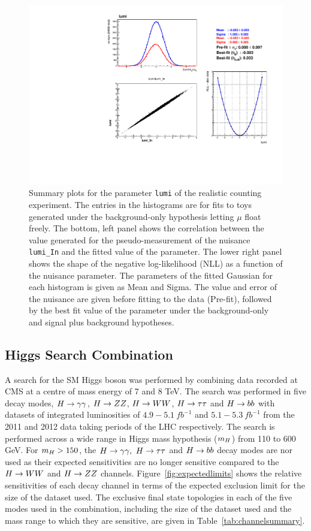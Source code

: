 \begin{figure}
  \begin{center}
    \includegraphics[width=\textwidth]{combinations/diagnostics/tree_fit_sb_lumi.pdf}
    \caption{Summary plots for the parameter \texttt{lumi} of the realistic counting experiment. 
	The entries in the histograms are for fits to toys generated under the background-only
	hypothesis letting $\mu$ float freely. The bottom, left panel shows the correlation
	between the value generated for the pseudo-measurement of the nuisance 
	\texttt{lumi\_In} and the fitted value of the parameter. 
	The lower right panel shows the shape of the 
	negative log-likelihood (NLL) as a function of the nuisance parameter.
	The parameters of the fitted Gaussian for each histogram is given as 
	Mean and Sigma. The value and error of the nuisance are given before fitting
	to the data (Pre-fit), followed by the best fit value of the parameter 
	under the background-only and signal plus background hypotheses.}
    \label{fig:real_lumi_s}
  \end{center}
\end{figure}

\subsection{Higgs Search Combination}
\label{combinedsearchresults}

A search for the SM Higgs boson was performed by combining data recorded at CMS 
at a centre of mass energy of 7 and 8 TeV. The search was performed in five
decay modes, $H\rightarrow\gamma\gamma$, $H\rightarrow ZZ$, $H\rightarrow WW$, $H\rightarrow\tau\tau$ and $H\rightarrow bb$ with datasets of
integrated luminosities of $4.9-5.1~fb^{-1}$ and $5.1-5.3~fb^{-1}$
from the 2011 and 2012 data taking periods of the LHC respectively.
The search is performed across a wide range in Higgs mass hypothesis ($m_{H}$) 
from 110 to 600 GeV. For $m_{H}>150$, the $H\rightarrow\gamma\gamma,~H\rightarrow\tau\tau$ and $H\rightarrow bb$ decay modes are nor used
as their expected sensitivities are no longer sensitive compared to the $H\rightarrow WW$ and
$H\rightarrow ZZ$ channels. Figure~\ref{fig:expectedlimits} shows the relative sensitivities of 
each decay channel in terms of the expected exclusion limit for the size of the dataset 
used. The exclusive final state topologies in each of the five modes used
in the combination, including the size of the dataset used and the mass range to
which they are sensitive, are given in Table~\ref{tab:channelsummary}.

